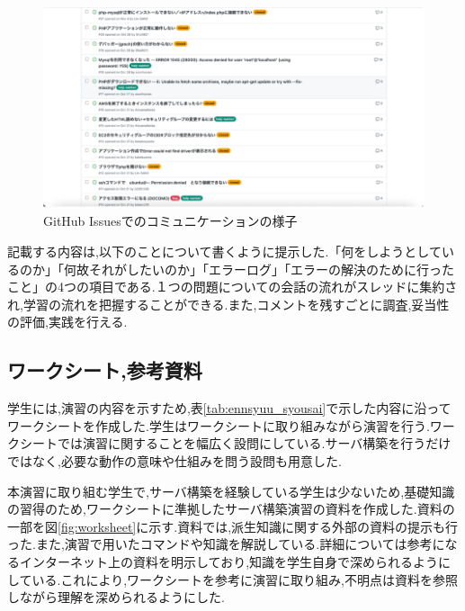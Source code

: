 \documentclass[11pt, a4paper]{jreport}
\begin{document}
\begin{figure}[H]
\begin{center}
\includegraphics[width=140mm]{./img/issuelist.png}
\caption{GitHub Issuesでのコミュニケーションの様子}
\label{fig:issuelist}
\end{center}
\end{figure}

記載する内容は,以下のことについて書くように提示した.「何をしようとしているのか」「何故それがしたいのか」「エラーログ」「エラーの解決のために行ったこと」の4つの項目である.１つの問題についての会話の流れがスレッドに集約され,学習の流れを把握することができる.また,コメントを残すごとに調査,妥当性の評価,実践を行える.

\subsection{ワークシート,参考資料}

学生には,演習の内容を示すため,表\ref{tab:ennsyuu_syousai}で示した内容に沿ってワークシートを作成した.学生はワークシートに取り組みながら演習を行う.ワークシートでは演習に関することを幅広く設問にしている.サーバ構築を行うだけではなく,必要な動作の意味や仕組みを問う設問も用意した.

本演習に取り組む学生で,サーバ構築を経験している学生は少ないため,基礎知識の習得のため,ワークシートに準拠したサーバ構築演習の資料\cite{bib:lamp}を作成した.資料の一部を図\ref{fig:worksheet}に示す.資料では,派生知識に関する外部の資料の提示も行った.また,演習で用いたコマンドや知識を解説している.詳細については参考になるインターネット上の資料を明示しており,知識を学生自身で深められるようにしている.これにより,ワークシートを参考に演習に取り組み,不明点は資料を参照しながら理解を深められるようにした.
\end{document}
